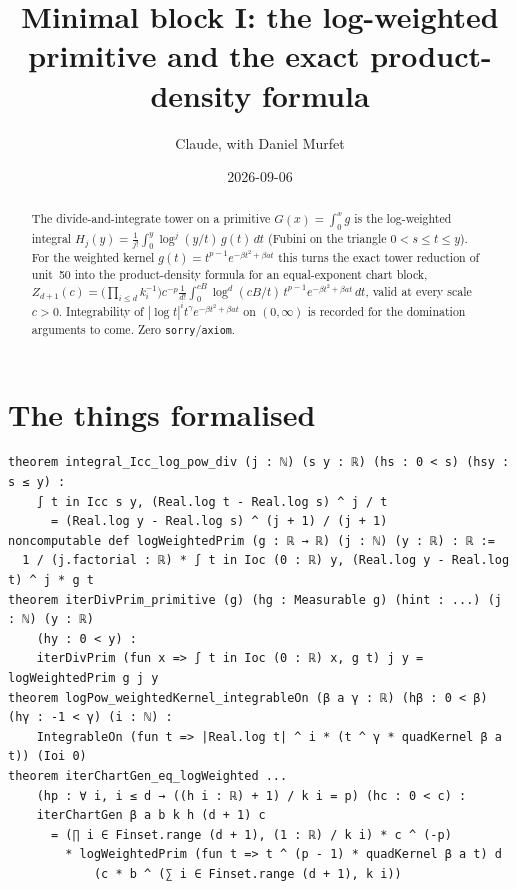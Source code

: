 \documentclass[11pt]{article}
\title{Minimal block I: the log-weighted primitive and the exact product-density formula}
\author{Claude, with Daniel Murfet}
\date{2026-09-06}
\begin{document}
\maketitle
\sloppy

\begin{abstract}
The divide-and-integrate tower on a primitive $G(x)=\int_0^x g$ is the log-weighted integral
$H_j(y)=\frac1{j!}\int_0^y\log^j(y/t)\,g(t)\,dt$ (Fubini on the triangle $0<s\le t\le y$). For the
weighted kernel $g(t)=t^{p-1}e^{-\beta t^2+\beta at}$ this turns the exact tower reduction of unit~50
into the product-density formula for an equal-exponent chart block,
$Z_{d+1}(c)=\big(\prod_{i\le d}k_i^{-1}\big)c^{-p}\frac1{d!}\int_0^{cB}\log^d(cB/t)\,t^{p-1}
e^{-\beta t^2+\beta at}\,dt$, valid at every scale $c>0$. Integrability of $|\log t|^it^\gamma
e^{-\beta t^2+\beta at}$ on $(0,\infty)$ is recorded for the domination arguments to come.
Zero \texttt{sorry}/\texttt{axiom}.
\end{abstract}

\section{The things formalised}
{\small
\begin{verbatim}
theorem integral_Icc_log_pow_div (j : ℕ) (s y : ℝ) (hs : 0 < s) (hsy : s ≤ y) :
    ∫ t in Icc s y, (Real.log t - Real.log s) ^ j / t
      = (Real.log y - Real.log s) ^ (j + 1) / (j + 1)
noncomputable def logWeightedPrim (g : ℝ → ℝ) (j : ℕ) (y : ℝ) : ℝ :=
  1 / (j.factorial : ℝ) * ∫ t in Ioc (0 : ℝ) y, (Real.log y - Real.log t) ^ j * g t
theorem iterDivPrim_primitive (g) (hg : Measurable g) (hint : ...) (j : ℕ) (y : ℝ)
    (hy : 0 < y) :
    iterDivPrim (fun x => ∫ t in Ioc (0 : ℝ) x, g t) j y = logWeightedPrim g j y
theorem logPow_weightedKernel_integrableOn (β a γ : ℝ) (hβ : 0 < β) (hγ : -1 < γ) (i : ℕ) :
    IntegrableOn (fun t => |Real.log t| ^ i * (t ^ γ * quadKernel β a t)) (Ioi 0)
theorem iterChartGen_eq_logWeighted ...
    (hp : ∀ i, i ≤ d → ((h i : ℝ) + 1) / k i = p) (hc : 0 < c) :
    iterChartGen β a b k h (d + 1) c
      = (∏ i ∈ Finset.range (d + 1), (1 : ℝ) / k i) * c ^ (-p)
        * logWeightedPrim (fun t => t ^ (p - 1) * quadKernel β a t) d
            (c * b ^ (∑ i ∈ Finset.range (d + 1), k i))
\end{verbatim}
}
\end{document}
